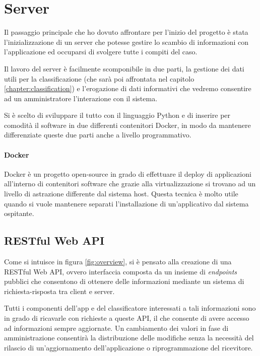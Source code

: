 \chapter{Server}
Il passaggio principale che ho dovuto affrontare per l'inizio del progetto è stata l'inizializzazione
di un server che potesse gestire lo scambio di informazioni con l'applicazione ed occuparsi di svolgere tutte i compiti del caso.

Il lavoro del server è facilmente scomponibile in due parti, la gestione dei dati utili per la classificazione 
(che sarà poi affrontata nel capitolo \ref{chapter:classification}) e l'erogazione di dati informativi che vedremo consentire
ad un amministratore l'interazione con il sistema.

Si è scelto di sviluppare il tutto con il linguaggio Python e di inserire per comodità il software in due differenti contenitori Docker, in modo da 
mantenere differenziate queste due parti anche a livello programmativo.

\subsubsection{Docker}
Docker \cite{docker} è un progetto open-source in grado di effettuare il deploy di applicazioni all'interno di contenitori software che grazie alla
virtualizzazione si trovano ad un livello di astrazione differente dal sistema host. Questa tecnica è molto utile quando si vuole
mantenere separati l'installazione di un'applicativo dal sistema ospitante.



\section{RESTful Web API}
\label{section:api}
Come si intuisce in figura \ref{fig:overview}, si è pensato alla creazione di una RESTful Web API, ovvero interfaccia composta da un insieme
di \textit{endpoints} pubblici che consentono di ottenere delle informazioni mediante un sistema di richiesta-risposta tra client e server.

Tutti i componenti dell'app e del classificatore interessati a tali informazioni sono in grado di ricavarle con richieste a queste API, il che 
consente di avere accesso ad informazioni sempre aggiornate. Un cambiamento dei valori in fase di amministrazione consentirà la 
distribuzione delle modifiche senza la necessità del rilascio di un'aggiornamento dell'applicazione o riprogrammazione del ricevitore.


